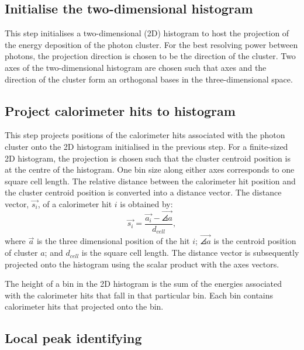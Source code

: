 \subsection{Initialise the  two-dimensional histogram}

This step initialises a two-dimensional (2D) histogram to host the projection of the energy deposition of the photon cluster. For the best resolving power between photons, the projection direction is chosen to be the direction of the cluster. Two axes of the two-dimensional histogram are chosen such that axes and the direction of the cluster form an orthogonal bases in the three-dimensional space.




\subsection{Project calorimeter hits to histogram}

This step projects positions of the calorimeter hits associated with the photon cluster onto the 2D histogram initialised in the previous step. For a finite-sized 2D histogram, the projection is chosen such that the cluster centroid position is at the centre of the histogram. One bin size along either axes corresponds to one \ECAL square cell length. The relative distance between the calorimeter hit position and the cluster centroid position is converted into a distance vector. The distance vector, $\vec{s_{i}}$, of a calorimeter hit $i$ is obtained by:
\begin{equation}
\vec{s_{i}} = \frac{\vec{a_{i}} -  \vec{\angles{a}}}{d_{cell}},
\end{equation}
where $\vec{a}$ is the three dimensional position of the hit $i$;  $\vec{\angles{a}}$ is the centroid position of cluster $a$; and $d_{cell}$ is the  \ECAL square cell length. The distance vector is subsequently projected onto the histogram using the scalar product with the axes vectors.


The height of a bin in the 2D histogram is the sum of the energies associated with the calorimeter hits that fall in that particular bin. Each bin contains calorimeter hits that projected onto the bin.


\subsection{Local peak identifying}

